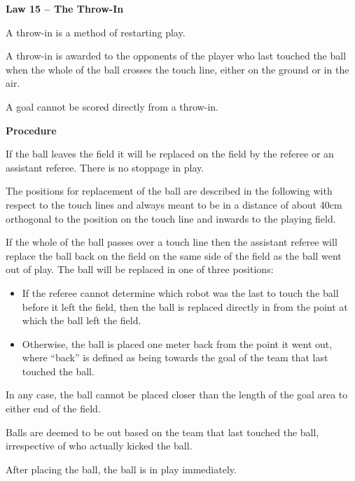 \clearpage
\sffamily
{\bfseries
\textcolor[rgb]{0.4,0.4,0.4}{Law 15 -- The Throw-In} }
{}


\bigskip

A throw-in is a method of restarting play.

\bigskip

A throw-in is awarded to the opponents of the player who last touched
the ball when the whole of the ball crosses the touch line, either on
the ground or in the air.

\bigskip

A goal cannot be scored directly from a throw-in.

\bigskip

{\bfseries Procedure }

\headlinebox 

If the ball leaves the field it will be replaced on the field by the
referee or an assistant referee. There is no stoppage in play.

The positions for replacement of the ball are described in the
following with respect to the touch lines and always meant to be in a
distance of about 40cm orthogonal to the position on the touch line and
inwards to the playing field. 

If the whole of the ball passes over a touch line then the assistant
referee will replace the ball back on the field on the same side of the
field as the ball went out of play. The ball will be replaced in one of
three positions: 

\begin{itemize}
\item If the referee cannot determine which robot was the last to touch
the ball before it left the field, then the ball is replaced directly
in from the point at which the ball left the field. 
\item Otherwise, the ball is placed one meter back from the point it
went out, where ``back'' is defined as being towards the goal of the team that last touched the ball. 
\end{itemize}

In any case, the ball cannot be placed closer than the length of the
goal area to either end of the field. 

Balls are deemed to be out based on the team that last touched the ball,
irrespective of who actually kicked the ball.

After placing the ball, the ball is in play immediately.


